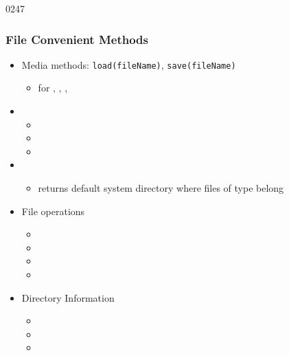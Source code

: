 \begin{slide}{0247}\frametitle{File Convenient Methods}
  \begin{itemize}
  \item Media methods: \texttt{load(fileName)}, \texttt{save(fileName)}
  \begin{itemize}
  \item for , , , 
  \end{itemize}
  \item {}
  \begin{itemize}
    \item {}
    \item {}
    \item {}
  \end{itemize}
  \item {}
  \begin{itemize}
    \item returns default system directory where files of type belong
  \end{itemize}
  \item File operations
  \begin{itemize}
    \item {}
    \item {}
    \item {}
    \item {}
  \end{itemize}          
  \item Directory Information
  \begin{itemize}
    \item {}
    \item {}
    \item {}
  \end{itemize}
  \end{itemize}
\end{slide}
